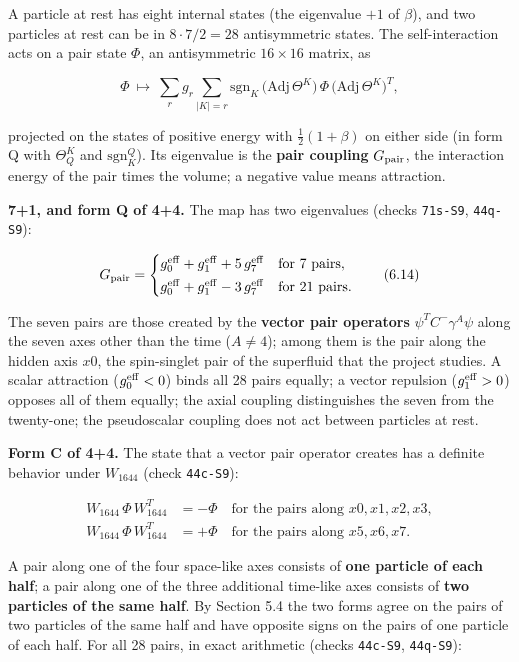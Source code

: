 \documentclass[
  10pt,
]{article}
\begin{document}
A particle at rest has eight internal states (the eigenvalue \(+1\) of
\(\beta\)), and two particles at rest can be in \(8\cdot7/2=28\)
antisymmetric states. The self-interaction acts on a pair state
\(\Phi\), an antisymmetric \(16\times16\) matrix, as

\[\Phi\ \mapsto\ \sum_{r}g_r\sum_{|K|=r}\mathrm{sgn}_K\,\big(\mathrm{Adj}\,\Theta^K\big)\,\Phi\,\big(\mathrm{Adj}\,\Theta^K\big)^T,\tag{6.13}\]

projected on the states of positive energy with \(\tfrac12(1+\beta)\) on
either side (in form Q with \(\Theta_Q^K\) and \(\mathrm{sgn}^Q_K\)).
Its eigenvalue is the \textbf{pair coupling} \(G_{\rm pair}\), the
interaction energy of the pair times the volume; a negative value means
attraction.

\textbf{7+1, and form Q of 4+4.} The map has two eigenvalues (checks
\texttt{71s-S9}, \texttt{44q-S9}):

\[G_{\rm pair}=\begin{cases}g_0^{\rm eff}+g_1^{\rm eff}+5\,g_7^{\rm eff}&\text{for 7 pairs},\\[2pt]
g_0^{\rm eff}+g_1^{\rm eff}-3\,g_7^{\rm eff}&\text{for 21 pairs}.\end{cases}\tag{6.14}\]

The seven pairs are those created by the \textbf{vector pair operators}
\(\psi^TC^-\gamma^A\psi\) along the seven axes other than the time
(\(A\neq4\)); among them is the pair along the hidden axis \(x0\), the
spin-singlet pair of the superfluid that the project studies. A scalar
attraction (\(g_0^{\rm eff}<0\)) binds all 28 pairs equally; a vector
repulsion (\(g_1^{\rm eff}>0\)) opposes all of them equally; the axial
coupling distinguishes the seven from the twenty-one; the pseudoscalar
coupling does not act between particles at rest.

\textbf{Form C of 4+4.} The state that a vector pair operator creates
has a definite behavior under \(W_{1644}\) (check \texttt{44c-S9}):

\[\begin{aligned}
W_{1644}\,\Phi\,W_{1644}^T&=-\Phi\quad\text{for the pairs along }x0,x1,x2,x3,\\
W_{1644}\,\Phi\,W_{1644}^T&=+\Phi\quad\text{for the pairs along }x5,x6,x7.
\end{aligned}\tag{6.15}\]

A pair along one of the four space-like axes consists of \textbf{one
particle of each half}; a pair along one of the three additional
time-like axes consists of \textbf{two particles of the same half}. By
Section 5.4 the two forms agree on the pairs of two particles of the
same half and have opposite signs on the pairs of one particle of each
half. For all 28 pairs, in exact arithmetic (checks \texttt{44c-S9},
\texttt{44q-S9}):
\end{document}
